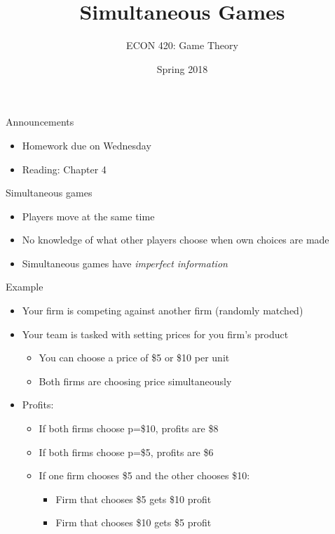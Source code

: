 \documentclass[10pt]{beamer}
\author{ECON 420: Game Theory}
\date{Spring 2018}
\title{Simultaneous Games}
\begin{document}
\maketitle

\begin{frame}[label={sec:org464b79c}]{}
\alert{Announcements}
\begin{itemize}
\item Homework due on Wednesday
\item Reading: Chapter 4
\end{itemize}
\end{frame}

\begin{frame}[label={sec:org75b03f0}]{}
\alert{Simultaneous games}
\begin{itemize}
\item Players move at the same time
\item No knowledge of what other players choose when own choices are made
\item Simultaneous games have \emph{imperfect information}
\end{itemize}
\end{frame}

\begin{frame}[label={sec:org4b15052}]{}
\alert{Example}
\begin{itemize}
\item Your firm is competing against another firm (randomly matched)
\item Your team is tasked with setting prices for you firm's product
\begin{itemize}
\item You can choose a price of \$5 or \$10 per unit
\item Both firms are choosing price simultaneously
\end{itemize}
\item Profits:
\begin{itemize}
\item If both firms choose p=\$10, profits are \$8
\item If both firms choose p=\$5, profits are \$6
\item If one firm chooses \$5 and the other chooses \$10:
\begin{itemize}
\item Firm that chooses \$5 gets \$10 profit
\item Firm that chooses \$10 gets \$5 profit
\end{itemize}
\end{itemize}
\end{itemize}
\end{frame}
\end{document}
